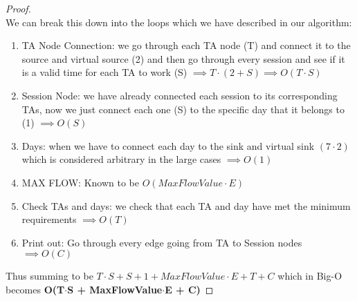 \documentclass[12pt]{article}
\begin{document}
\begin{proof}
~ \\ \indent We can break this down into the loops which we have described in our algorithm:
\begin{enumerate}
    \item TA Node Connection: we go through each TA node (T) and connect it to the source and
        virtual source (2) and then go through every session and see if it is a valid time
        for each TA to work (S) $\implies T\cdot (2+S) \implies O(T\cdot S)$
    \item Session Node: we have already connected each session to its corresponding TAs, now
        we just connect each one (S) to the specific day that it belongs to (1) $\implies O(S)$
    \item Days: when we have to connect each day to the sink and virtual sink $(7\cdot 2)$ which
        is considered arbitrary in the large cases $\implies O(1)$
    \item MAX FLOW: Known to be $O(MaxFlowValue\cdot E)$
    \item Check TAs and days: we check that each TA and day have met the minimum requirements
        $\implies O(T)$
    \item Print out: Go through every edge going from TA to Session nodes $\implies O(C)$
\end{enumerate}
Thus summing to be $T\cdot S + S + 1 + MaxFlowValue\cdot E + T + C$ which in Big-O becomes
\textbf{O(T$\cdot$S + MaxFlowValue$\cdot$E + C)}
\end{proof}




\end{document}
